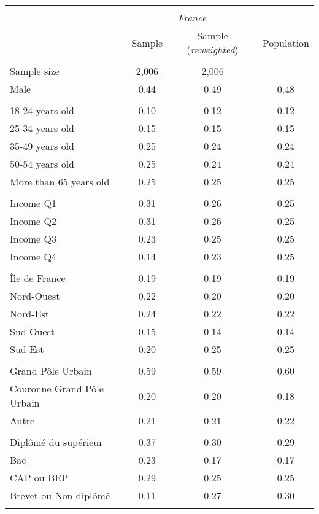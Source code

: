 \begin{tabular}{lccc}
\toprule
\hline \\[-1.8ex]
\multicolumn{1}{c}{\em{ }} & \multicolumn{2}{c}{\em{France}}\\
\cmidrule(l{3pt}r{3pt}){2-3}
\noalign{\smallskip}  & Sample & Sample (\textit{reweighted}) & Population\\
\hline \\[-1.8ex] 
Sample size & 2,006 & 2,006 &  \\
\noalign{\smallskip}\hline \noalign{\smallskip}Male & 0.44 & 0.49 & 0.48\\ 
\\
18-24 years old & 0.10 & 0.12 & 0.12\\
25-34 years old & 0.15 & 0.15 & 0.15\\
35-49 years old & 0.25 & 0.24 & 0.24\\
50-54 years old & 0.25 & 0.24 & 0.24\\
More than 65 years old & 0.25 & 0.25 & 0.25\\ 
\\
Income Q1 & 0.31 & 0.26 & 0.25\\
Income Q2 & 0.31 & 0.26 & 0.25\\
Income Q3 & 0.23 & 0.25 & 0.25\\
Income Q4 & 0.14 & 0.23 & 0.25\\
\\
Île de France & 0.19 & 0.19 & 0.19\\
Nord-Ouest & 0.22 & 0.20 & 0.20\\
Nord-Est & 0.24 & 0.22 & 0.22\\
Sud-Ouest & 0.15 & 0.14 & 0.14\\
Sud-Est & 0.20 & 0.25 & 0.25\\
\\
Grand Pôle Urbain & 0.59 & 0.59 & 0.60\\
Couronne Grand Pôle Urbain & 0.20 & 0.20 & 0.18\\
Autre & 0.21 & 0.21 & 0.22\\
\\
Diplômé du supérieur & 0.37 & 0.30 & 0.29\\
Bac & 0.23 & 0.17 & 0.17\\
CAP ou BEP & 0.29 & 0.25 & 0.25\\
Brevet ou Non diplômé & 0.11 & 0.27 & 0.30\\
\\
\bottomrule
\end{tabular}